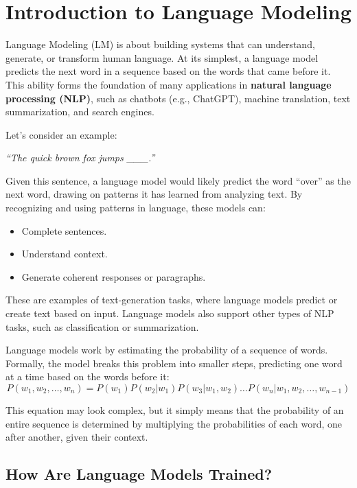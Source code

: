 \section{Introduction to Language Modeling}
\large Language Modeling (LM) is about building systems that can understand, generate, or transform human language. At its simplest, a language model predicts the next word in a sequence based on the words that came before it. This ability forms the foundation of many applications in \textbf{natural language processing (NLP)}, such as chatbots (e.g., ChatGPT), machine translation, text summarization, and search engines. 

Let’s consider an example:

\begin{center}
    \textit{``The quick brown fox jumps \_\_\_.''}
\end{center}

Given this sentence, a language model would likely predict the word “over” as the next word, drawing on patterns it has learned from analyzing text. By recognizing and using patterns in language, these models can:
\begin{itemize}
    \item Complete sentences.
    \item Understand context.
    \item Generate coherent responses or paragraphs.
\end{itemize}

These are examples of text-generation tasks, where language models predict or create text based on input. Language models also support other types of NLP tasks, such as classification or summarization. 

Language models work by estimating the probability of a sequence of words. Formally, the model breaks this problem into smaller steps, predicting one word at a time based on the words before it:
\[
P(w_1, w_2, \dots, w_n) = P(w_1)P(w_2|w_1)P(w_3|w_1, w_2)\dots P(w_n|w_1, w_2, \dots, w_{n-1})
\]

This equation may look complex, but it simply means that the probability of an entire sequence is determined by multiplying the probabilities of each word, one after another, given their context.


\subsection{How Are Language Models Trained?}

